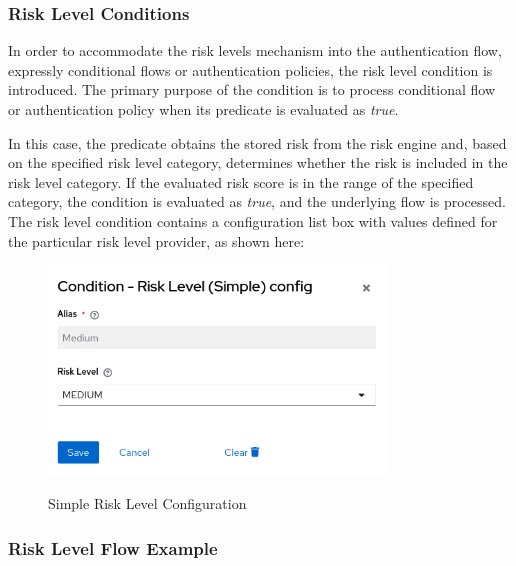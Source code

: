 \newpage

\subsubsection{Risk Level Conditions}
In order to accommodate the risk levels mechanism into the authentication flow, expressly conditional flows or authentication policies, the risk level condition is introduced.
The primary purpose of the condition is to process conditional flow or authentication policy when its predicate is evaluated as \textit{true}.

In this case, the predicate obtains the stored risk from the risk engine and, based on the specified risk level category, determines whether the risk is included in the risk level category.
If the evaluated risk score is in the range of the specified category, the condition is evaluated as \textit{true}, and the underlying flow is processed.
\newline
\newline
The risk level condition contains a configuration list box with values defined for the particular risk level provider, as shown here:

\begin{figure}[htbp]
  \centering
  \includegraphics[width=0.8\textwidth]{img/sections/5-design/risk-level-simple-config.png}
  \label{fig:risk-levels-simple-config}
  \caption{Simple Risk Level Configuration}
\end{figure}
\newpage
\subsubsection{Risk Level Flow Example}

